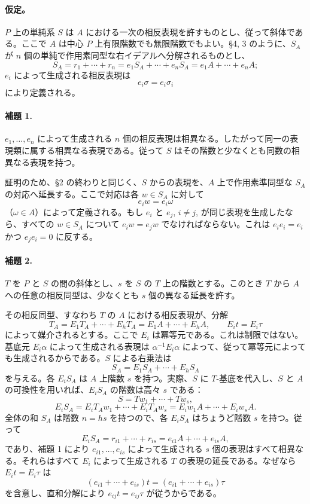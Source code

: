 \paragraph{仮定。}
\(P\) 上の単純系 \(S\) は \(A\) における一次の相反表現を許すものとし、従って斜体である。ここで \(A\) は中心 \(P\) 上有限階数でも無限階数でもよい。§4, 3 のように、\(S_A\) が \(n\) 個の単純で作用素同型な右イデアルへ分解されるものとし、
\[
        S_A=r_1+\cdots+r_n
            =e_1S_A+\cdots+e_nS_A
            =e_1A+\cdots+e_nA ;
\]
\(e_i\) によって生成される相反表現は
\[
        e_i\sigma=e_i\sigma_i
\]
により定義される。

\paragraph{補題 1.}
\(e_1,\ldots,e_n\) によって生成される \(n\) 個の相反表現は相異なる。したがって同一の表現類に属する相異なる表現である。従って \(S\) はその階数と少なくとも同数の相異なる表現を持つ。

証明のため、§2 の終わりと同じく、\(S\) からの表現を、\(A\) 上で作用素準同型な \(S_A\) の対応へ延長する。ここで対応は各 \(w\in S_A\) に対して
\[
        e_iw=e_i\omega
\]
（\(\omega\in A\)）によって定義される。もし \(e_i\) と \(e_j\), \(i\ne j\), が同じ表現を生成したなら、すべての \(w\in S_A\) について \(e_iw=e_jw\) でなければならない。これは \(e_ie_i=e_i\) かつ \(e_je_i=0\) に反する。

\paragraph{補題 2.}
\(T\) を \(P\) と \(S\) の間の斜体とし、\(s\) を \(S\) の \(T\) 上の階数とする。このとき \(T\) から \(A\) への任意の相反同型は、少なくとも \(s\) 個の異なる延長を許す。

その相反同型、すなわち \(T\) の \(A\) における相反表現が、分解
\[
        T_A=E_1T_A+\cdots+E_hT_A
            =E_1A+\cdots+E_hA,
        \qquad E_it=E_i\tau
\]
によって媒介されるとする。ここで \(E_i\) は冪等元である。これは制限ではない。基底元 \(E_i\alpha\) によって生成される表現は \(\alpha^{-1}E_i\alpha\) によって、従って冪等元によっても生成されるからである。\(S\) による右乗法は
\[
        S_A=E_1S_A+\cdots+E_hS_A
\]
を与える。各 \(E_iS_A\) は \(A\) 上階数 \(s\) を持つ。実際、\(S\) に \(T\)-基底を代入し、\(S\) と \(A\) の可換性を用いれば、\(E_iS_A\) の階数は高々 \(s\) である：
\[
        S=Tw_1+\cdots+Tw_s,
\]
\[
        E_iS_A=E_iT_Aw_1+\cdots+E_iT_Aw_s
              =E_iw_1A+\cdots+E_iw_sA .
\]
全体の和 \(S_A\) は階数 \(n=hs\) を持つので、各 \(E_iS_A\) はちょうど階数 \(s\) を持つ。従って
\[
        E_iS_A=r_{i1}+\cdots+r_{is}
              =e_{i1}A+\cdots+e_{is}A,
\]
であり、補題 1 により \(e_{i1},\ldots,e_{is}\) によって生成される \(s\) 個の表現はすべて相異なる。それらはすべて \(E_i\) によって生成される \(T\) の表現の延長である。なぜなら \(E_it=E_i\tau\) は
\[
        (e_{i1}+\cdots+e_{is})t=(e_{i1}+\cdots+e_{is})\tau
\]
を含意し、直和分解により \(e_{ij}t=e_{ij}\tau\) が従うからである。

